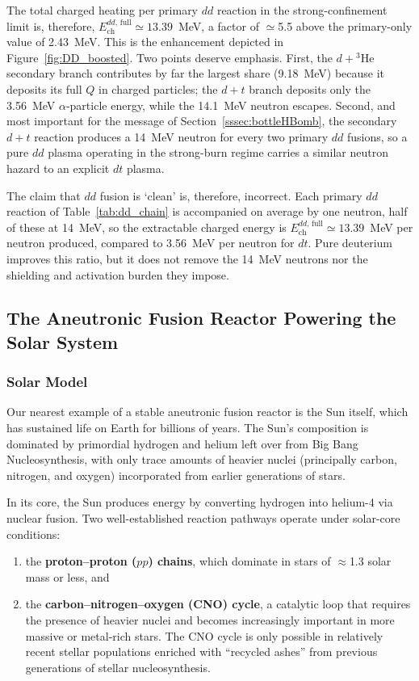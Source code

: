 \documentclass[particles,article,accept,pdftex,moreauthors]{Definitions/mdpi}
\begin{document}
The total charged heating per primary $dd$ reaction in the strong-confinement limit is, therefore, $E_\mathrm{ch}^{dd,\,\mathrm{full}}\simeq 13.39$~MeV, a factor of $\simeq$5.5 above the primary-only value of 2.43~MeV. This is the enhancement depicted in Figure~\ref{fig:DD_boosted}. Two points deserve emphasis. First, the $d+{}^3\mathrm{He}$ secondary branch contributes by far the largest share (9.18~MeV) because it deposits its full $Q$ in charged particles; the $d+t$ branch deposits only the 3.56~MeV $\alpha$-particle energy, while the 14.1~MeV neutron escapes. Second, and most important for the message of Section~\ref{sssec:bottleHBomb}, the secondary $d+t$ reaction produces a 14~MeV neutron for every two primary $dd$ fusions, so a pure $dd$ plasma operating in the strong-burn regime carries a similar neutron hazard to an explicit $dt$ plasma.

The claim that $dd$ fusion is `clean' is, therefore, incorrect. Each primary $dd$ reaction of Table~\ref{tab:dd_chain} is accompanied on average by one neutron, half of these at 14~MeV, so the extractable charged energy is $E_\mathrm{ch}^{dd,\,\mathrm{full}}\simeq13.39$~MeV per neutron produced, compared to 3.56~MeV per neutron for $dt$. Pure deuterium improves this ratio, but it does not remove the 14~MeV neutrons nor the shielding and activation burden they impose.

\subsection{The Aneutronic Fusion Reactor Powering the Solar System}\label{ssec:SolarFusion}
\subsubsection{Solar Model}\label{sssec:Solar}
Our nearest example of a stable aneutronic fusion reactor is the Sun itself, which has sustained life on Earth for billions of years. The Sun's composition is dominated by primordial hydrogen and helium left over from Big Bang Nucleosynthesis, with only trace amounts of heavier nuclei (principally carbon, nitrogen, and oxygen) incorporated from earlier generations of stars.

In its core, the Sun produces energy by converting hydrogen into helium-4 via nuclear fusion. Two well-established reaction pathways operate under solar-core conditions:
\begin{enumerate}
\item[(1)] the \textbf{proton--proton ($pp$) chains}, which dominate in stars of $\approx$1.3 solar mass or less, and
\item[(2)] the \textbf{carbon--nitrogen--oxygen (CNO) cycle}, a catalytic loop that requires the presence of heavier nuclei and becomes increasingly important in more massive or metal-rich stars. The CNO cycle is only possible in relatively recent stellar populations enriched with ``recycled ashes'' from previous generations of stellar nucleosynthesis.
\end{enumerate}
\end{document}
